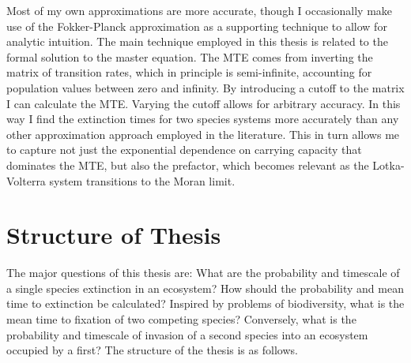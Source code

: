 %
Most of my own approximations are more accurate, though I occasionally make use of the Fokker-Planck approximation as a supporting technique to allow for analytic intuition. 
The main technique employed in this thesis is related to the formal solution to the master equation. 
The MTE comes from inverting the matrix of transition rates, which in principle is semi-infinite, accounting for population values between zero and infinity. 
By introducing a cutoff to the matrix I can calculate the MTE. 
Varying the cutoff allows for arbitrary accuracy. 
In this way I find the extinction times for two species systems more accurately than any other approximation approach employed in the literature. 
This in turn allows me to capture not just the exponential dependence on carrying capacity that dominates the MTE, but also the prefactor, which becomes relevant as the Lotka-Volterra system transitions to the Moran limit. 

\fi



\section{Structure of Thesis}

The major questions of this thesis are: What are the probability and timescale of a single species extinction in an ecosystem? %
How should the probability and mean time to extinction be calculated? 
Inspired by problems of biodiversity, what is the mean time to fixation of two competing species? 
Conversely, what is the probability and timescale of invasion of a second species into an ecosystem occupied by a first? 
The structure of the thesis is as follows. 

